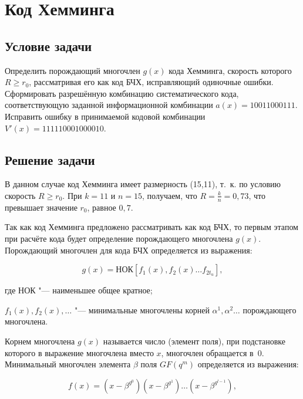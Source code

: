 \section{Код Хемминга}
\label{sec:hemming}

\subsection{Условие задачи}

Определить порождающий многочлен $g(x)$ кода Хемминга, скорость
которого $R \geqslant r_0$, рассматривая его как код БЧХ, исправляющий
одиночные ошибки. Сформировать разрешённую комбинацию систематического
кода, соответствующую заданной информационной комбинации $a(x) =
10011000111$. Исправить ошибку в принимаемой кодовой комбинации
$V'(x) = 111110001000010$.

\subsection{Решение задачи}

В данном случае код Хемминга имеет размерность (15,11), т.~к. по
условию скорость $R \geqslant r_0$. При $k = 11$ и $n = 15$, получаем,
что $R = \frac{k}{n} = 0{,}73$, что превышает значение $r_0$, равное
$0{,}7$.

Так как код Хемминга предложено рассматривать как код БЧХ, то первым
этапом при расчёте кода будет определение порождающего многочлена
$g(x)$. Порождающий многочлен для кода БЧХ определяется из выражения:

\begin{equation*}
  g(x) = \text{НОК}\left[f_1(x), f_2(x) \ldots f_{2t_u} \right],
\end{equation*}

\begin{ESKDexplanation}
\item[где ] НОК "--- наименьшее общее кратное;
\item $f_1(x), f_2(x), \ldots$ "--- минимальные многочлены корней
  $\alpha^1, \alpha^2 \ldots$ порождающего многочлена.
\end{ESKDexplanation}

Корнем многочлена $g(x)$ называется число (элемент поля), при
подстановке которого в выражение многочлена вместо $x$, многочлен
обращается в~0. Минимальный многочлен элемента $\beta$ поля $GF(q^m)$
определяется из выражения:

\begin{equation*}
  f(x) = (x - \beta^{g^0})(x - \beta^{g^1}) \ldots (x - \beta^{g^{l-1}}),
\end{equation*}

